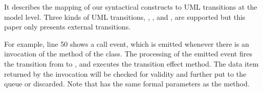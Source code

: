 

\noindent
{}
It describes the mapping of our syntactical constructs to UML transitions at the model level. 
Three kinds of UML transitions, , , and , are supported but this paper only presents external transitions.

For example, line 50 shows a call event, which is emitted whenever there is an invocation of the  method of the  class. 
The processing of the emitted event fires the transition from  to , and executes the  transition effect method.
The data item returned by the invocation will be checked for validity and further put to the queue or discarded.
Note that  has the same formal parameters as the  method.



